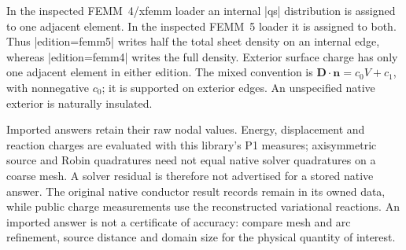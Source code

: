 In the inspected FEMM~4/xfemm loader an internal |qs| distribution is assigned to
one adjacent element. In the inspected FEMM~5 loader it is assigned to both.
Thus |edition=femm5| writes half the total sheet density on an internal edge,
whereas |edition=femm4| writes the full density. Exterior surface charge has
only one adjacent element in either edition. The mixed convention is
$\mathbf D\cdot\mathbf n=c_0V+c_1$, with nonnegative $c_0$; it is supported on
exterior edges. An unspecified native exterior is naturally insulated.

Imported answers retain their raw nodal values. Energy, displacement and reaction
charges are evaluated with this library's P1 measures; axisymmetric source and
Robin quadratures need not equal native solver quadratures on a coarse mesh.
A solver residual is therefore not advertised for a stored native answer.
The original native conductor result records remain in its owned data, while
public charge measurements use the reconstructed variational reactions.
An imported answer is not a certificate of accuracy: compare mesh and arc
refinement, source distance and domain size for the physical quantity of interest.

